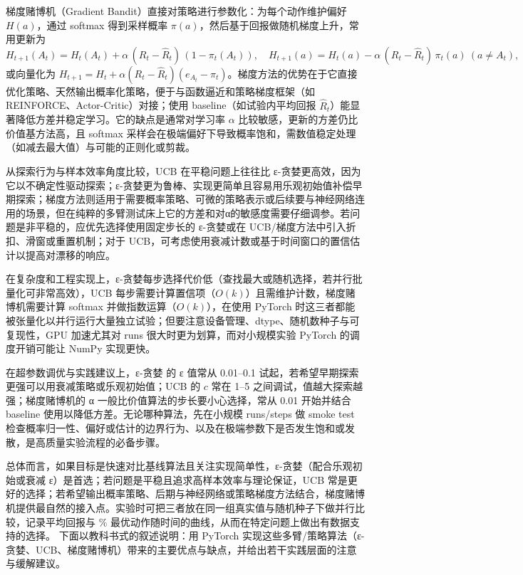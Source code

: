 \documentclass[11pt]{ctexart}
\begin{document}
梯度赌博机（Gradient Bandit）直接对策略进行参数化：为每个动作维护偏好
\(H(a)\)，通过 softmax 得到采样概率
\(\pi(a)\)，然后基于回报做随机梯度上升，常用更新为
\[H_{t+1}(A_t)=H_t(A_t)+\alpha\,(R_t-\hat R_t)\,(1-\pi_t(A_t)),\quad H_{t+1}(a)=H_t(a)-\alpha\,(R_t-\hat R_t)\,\pi_t(a)\ (a\ne A_t),\]
或向量化为
\(H_{t+1}=H_t+\alpha(R_t-\hat R_t)(e_{A_t}-\pi_t)\)。梯度方法的优势在于它直接优化策略、天然输出概率化策略，便于与函数逼近和策略梯度框架（如
REINFORCE、Actor-Critic）对接；使用 baseline（如试验内平均回报
\(\hat R_t\)）能显著降低方差并稳定学习。它的缺点是通常对学习率
\(\alpha\) 比较敏感，更新的方差仍比价值基方法高，且 softmax
采样会在极端偏好下导致概率饱和，需数值稳定处理（如减去最大值）与可能的正则化或剪裁。

从探索行为与样本效率角度比较，UCB 在平稳问题上往往比
ε-贪婪更高效，因为它以不确定性驱动探索；ε-贪婪更为鲁棒、实现更简单且容易用乐观初始值补偿早期探索；梯度方法则适用于需要概率策略、可微的策略表示或后续要与神经网络连用的场景，但在纯粹的多臂测试床上它的方差和对α的敏感度需要仔细调参。若问题是非平稳的，应优先选择使用固定步长的
ε-贪婪或在 UCB/梯度方法中引入折扣、滑窗或重置机制；对于
UCB，可考虑使用衰减计数或基于时间窗口的置信估计以提高对漂移的响应。

在复杂度和工程实现上，ε-贪婪每步选择代价低（查找最大或随机选择，若并行批量化可非常高效），UCB
每步需要计算置信项（\(O(k)\)）且需维护计数，梯度赌博机需要计算 softmax
并做指数运算（\(O(k)\)），在使用 PyTorch
时这三者都能被张量化以并行运行大量独立试验；但要注意设备管理、dtype、随机数种子与可复现性，GPU
加速尤其对 runs 很大时更为划算，而对小规模实验 PyTorch 的调度开销可能让
NumPy 实现更快。

在超参数调优与实践建议上，ε-贪婪 的 ε 值常从 0.01--0.1
试起，若希望早期探索更强可以用衰减策略或乐观初始值；UCB 的 \(c\) 常在
1--5 之间调试，值越大探索越强；梯度赌博机的 α
一般比价值算法的步长要小心选择，常从 0.01 开始并结合 baseline
使用以降低方差。无论哪种算法，先在小规模 runs/steps 做 smoke test
检查概率归一性、偏好或估计的边界行为、以及在极端参数下是否发生饱和或发散，是高质量实验流程的必备步骤。

总体而言，如果目标是快速对比基线算法且关注实现简单性，ε-贪婪（配合乐观初始或衰减
ε）是首选；若问题是平稳且追求高样本效率与理论保证，UCB
常是更好的选择；若希望输出概率策略、后期与神经网络或策略梯度方法结合，梯度赌博机提供最自然的接入点。实验时可把三者放在同一组真实值与随机种子下做并行比较，记录平均回报与
\% 最优动作随时间的曲线，从而在特定问题上做出有数据支持的选择。
下面以教科书式的叙述说明：用 PyTorch
实现这些多臂/策略算法（ε-贪婪、UCB、梯度赌博机）带来的主要优点与缺点，并给出若干实践层面的注意与缓解建议。
\end{document}
